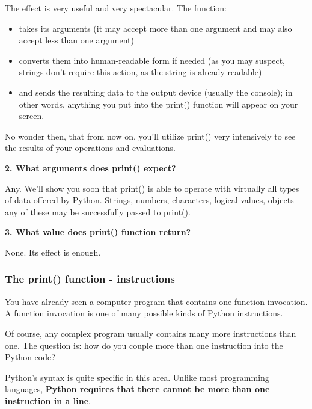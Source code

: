 \documentclass[a4paper,10pt]{article}
\begin{document}
The effect is very useful and very spectacular. The function:
\begin{itemize}
 \item takes its arguments (it may accept more than one argument and may also accept less than one argument)
 \item converts them into human-readable form if needed (as you may suspect, strings don't require this action, as the string is already readable)
 \item and sends the resulting data to the output device (usually the console); in other words, anything you put into the print() function will appear on your screen.
\end{itemize}

No wonder then, that from now on, you'll utilize {\selectfont print()} very intensively to see the results of your operations and evaluations.
\newline

\textbf{2. What arguments does {\selectfont print()} expect?}
\newline

Any. We'll show you soon that {\selectfont print()} is able to operate with virtually all types of data offered by Python. Strings, numbers, characters, logical values, objects - any of these may be successfully passed to {\selectfont print()}.
\newline

\textbf{3. What value does {\selectfont print()} function return?}
\newline

None. Its effect is enough.

\subsubsection{The print() function - instructions}
You have already seen a computer program that contains one function invocation. A function invocation is one of many possible kinds of Python instructions.
\newline

Of course, any complex program usually contains many more instructions than one. The question is: how do you couple more than one instruction into the Python code?
\newline

Python's syntax is quite specific in this area. Unlike most programming languages, \textbf{Python requires that there cannot be more than one instruction in a line}.
\newline
\end{document}
